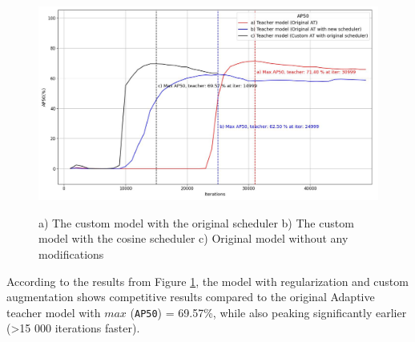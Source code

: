 \documentclass[english, 12pt, a4paper, elec, utf8, a-1b, online]{aaltothesis}
\begin{document}
\begin{figure}[htb]
	\begin{center}
		\includegraphics[width=14cm]{./AP50_myModel_origScheduler.jpg}
	\end{center}
	\caption{a) The custom model with the original scheduler b) The custom model with the cosine scheduler c) Original model without any modifications}
	\begin{center}
		\label{myModel_withOrigSched}
	\end{center}
\end{figure}
\FloatBarrier  

According to the results from Figure \ref{myModel_withOrigSched}, the model with regularization and custom augmentation shows competitive results compared to the original Adaptive teacher model with $max$ (\texttt{AP50}) = 69.57\%, while also peaking significantly earlier (>15 000 iterations faster).  
\end{document}
